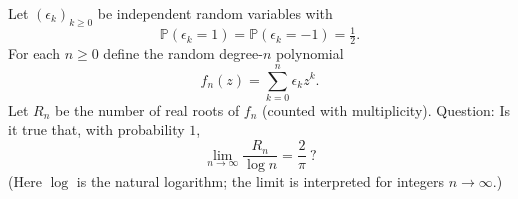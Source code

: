 Let $(\epsilon_k)_{k\ge 0}$ be independent random variables with
\[\mathbb P(\epsilon_k=1)=\mathbb P(\epsilon_k=-1)=\tfrac12.
\]
For each $n\ge 0$ define the random degree-$n$ polynomial
\[f_n(z)=\sum_{k=0}^n \epsilon_k z^k.
\]
Let $R_n$ be the number of real roots of $f_n$ (counted with multiplicity).
Question: Is it true that, with probability $1$,
\[\lim_{n\to\infty} \frac{R_n}{\log n} = \frac{2}{\pi}\ ?\]
(Here $\log$ is the natural logarithm; the limit is interpreted for integers $n\to\infty$.)
